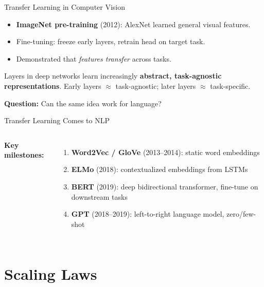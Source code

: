 \documentclass[aspectratio=169,10pt]{beamer}
\begin{document}
\begin{frame}{Transfer Learning in Computer Vision}
  \begin{itemize}
    \item \textbf{ImageNet pre-training} (2012): AlexNet learned general visual features.
    \item Fine-tuning: freeze early layers, retrain head on target task.
    \item Demonstrated that \emph{features transfer} across tasks.
  \end{itemize}
  \vspace{0.5em}
  \begin{tcolorbox}[hitbox, title=Key Insight]
    Layers in deep networks learn increasingly \textbf{abstract, task-agnostic representations}.
    Early layers $\approx$ task-agnostic; later layers $\approx$ task-specific.
  \end{tcolorbox}
  \vspace{0.3em}
  \textbf{Question:} Can the same idea work for language?
\end{frame}

\begin{frame}{Transfer Learning Comes to NLP}
  \begin{columns}[T]
      \textbf{Key milestones:}
      \begin{enumerate}
        \item \textbf{Word2Vec / GloVe} (2013–2014): static word embeddings
        \item \textbf{ELMo} (2018): contextualized embeddings from LSTMs
        \item \textbf{BERT} (2019): deep bidirectional transformer, fine-tune on downstream tasks~\cite{devlin2019bert}
        \item \textbf{GPT} (2018–2019): left-to-right language model, zero/few-shot~\cite{radford2019gpt2}
      \end{enumerate}
  \end{columns}
\end{frame}

\section{Scaling Laws}
\end{document}
